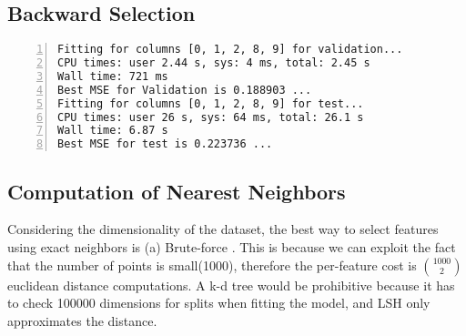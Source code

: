 \subsection{Backward Selection}
\begin{lstlisting}[language={},numbers=left,numberstyle=\tiny,frame = single]
Fitting for columns [0, 1, 2, 8, 9] for validation...
CPU times: user 2.44 s, sys: 4 ms, total: 2.45 s
Wall time: 721 ms
Best MSE for Validation is 0.188903 ...
Fitting for columns [0, 1, 2, 8, 9] for test...
CPU times: user 26 s, sys: 64 ms, total: 26.1 s
Wall time: 6.87 s
Best MSE for test is 0.223736 ...
\end{lstlisting}

\subsection{Computation of Nearest Neighbors}
Considering the dimensionality of the dataset, the best way to select features using exact neighbors is (a) Brute-force . This is because we can exploit the fact that the number of points is small(1000), therefore the per-feature cost is $\binom{1000}{2}$ euclidean distance computations. A k-d tree would be prohibitive because it has to check 100000 dimensions for splits when fitting the model, and LSH only approximates the distance.